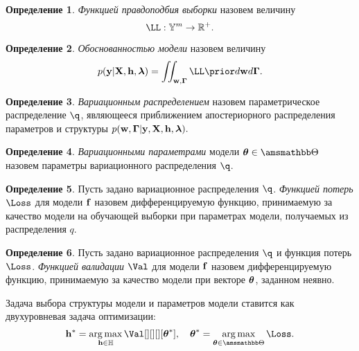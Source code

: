 \documentclass[11pt, a5paper]{dissert}
\theoremstyle{definition}
\newtheorem{defin}{Определение}
\DeclareMathOperator*{\argmax}{arg\,max}
\begin{document}
\begin{defin}
\textit{Функцией правдоподбия выборки } назовем величину
\[
    \LL : {\yb}^m \to \mathbb{R}^{+}.
\]
\end{defin}
 
\begin{defin}
\textit{Обоснованностью модели }назовем величину
\begin{equation}
\label{eq:evidence}
\EV = \iint_{\mathbf{w}, \boldsymbol{\Gamma}} \LL \prior  d\mathbf{w}d\boldsymbol{\Gamma}.
\end{equation}
\end{defin}


\begin{defin}
\textit{Вариационным распределением} назовем параметрическое распределение $\q$, являющееся приближением  апостериорного распределения параметров и структуры $p(\mathbf{w}, \boldsymbol{\Gamma}|\mathbf{y}, \mathbf{X}, \mathbf{h},\boldsymbol{\lambda}).$ 
\end{defin}

\begin{defin}
\textit{Вариационными параметрами} модели $\teta \in \Tetab$ назовем параметры вариационного распределения $\q$.
\end{defin} 

\begin{defin}
\label{def:l}
Пусть задано вариационное распределения $\q$.
\textit{Функцией потерь} $\Loss$ для модели $\mathbf{f}$ назовем дифференцируемую функцию, принимаемую за качество модели на обучающей выборки при параметрах модели, получаемых из  распределения $q$.
\end{defin}

\begin{defin}
\label{def:q}
Пусть задано вариационное распределения $\q$ и функция потерь $\Loss$. 
\textit{Функцией валидации} $\Val$ для модели $\mathbf{f}$ назовем дифференцируемую функцию, принимаемую за качество модели при векторе $\boldsymbol{\theta}$, заданном неявно.
\end{defin}

 

Задача выбора структуры модели и параметров модели ставится как двухуровневая задача оптимизации:
\begin{equation}
\label{eq:optim_problem}
	\h^{*} = \argmax_{\h  \in \Hb} \Val[][][][\teta^{*}], \quad   \teta^{*} = \argmax_{\teta \in \Tetab} \Loss.
\end{equation}
\end{document}
